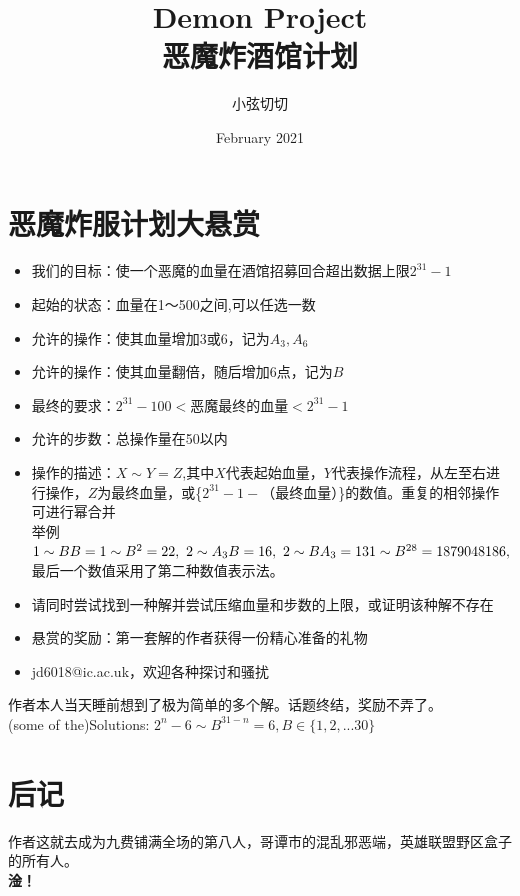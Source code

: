 \documentclass{ctexart}
\title{Demon Project\\
恶魔炸酒馆计划}
\author{小弦切切 }
\date{February 2021}
\begin{document}
\maketitle
\newpage
\section*{恶魔炸服计划大悬赏}
\begin{itemize}
    \item 我们的目标：使一个恶魔的血量在酒馆招募回合超出数据上限$2^{31}-1$
    \item 起始的状态：血量在1～500之间,可以任选一数
    \item 允许的操作：使其血量增加3或6，记为$A_3,A_6$
    \item 允许的操作：使其血量翻倍，随后增加6点，记为$B$
    \item 最终的要求：$2^{31}-100<$恶魔最终的血量$<2^{31}-1$
    \item 允许的步数：总操作量在50以内
    \item 操作的描述：$X \sim Y=Z$,其中$X$代表起始血量，$Y$代表操作流程，从左至右进行操作，$Z$为最终血量，或\{$2^{31}-1-$（最终血量）\}的数值。重复的相邻操作可进行幂合并\\
    举例$1 \sim BB=1 \sim B^2 = 22, \ 2 \sim A_3B=16, \ 2 \sim BA_3=13 \\
    1 \sim B^{28}=1879048186 ,$最后一个数值采用了第二种数值表示法。
    \item 请同时尝试找到一种解并尝试压缩血量和步数的上限，或证明该种解不存在
    \item 悬赏的奖励：第一套解的作者获得一份精心准备的礼物
    \item jd6018@ic.ac.uk，欢迎各种探讨和骚扰
\end{itemize}
作者本人当天睡前想到了极为简单的多个解。话题终结，奖励不弄了。\\
(some of the)Solutions: $2^n-6 \sim B^{31-n}=6, B \in \{1,2,...30\}$
\section*{后记}
作者这就去成为九费铺满全场的第八人，哥谭市的混乱邪恶端，英雄联盟野区盒子的所有人。\\
\bfseries{淦！}
\end{document}
